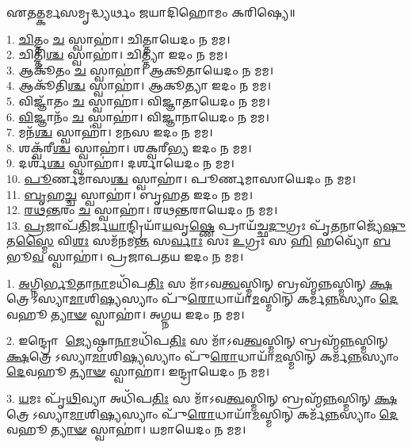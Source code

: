 
𑌏𑌤𑌤𑍍𑌕𑌰𑍍𑌮𑌸𑌮𑍃𑌦𑍍𑌧𑍍𑌯𑌰𑍍𑌥𑌂 𑌜𑌯𑌾𑌦𑌿𑌹𑍋𑌮𑌂 𑌕𑌰𑌿𑌷𑍍𑌯𑍇॥

1. \ul{𑌚𑌿}\-𑌤𑍍𑌤𑌂 \ul{𑌚} 𑌸𑍍𑌵𑌾𑌹𑌾॑। 𑌚𑌿𑌤𑍍𑌤𑌾𑌯𑍇𑌦𑌂 𑌨 𑌮𑌮।\\
2. 𑌚𑌿𑌤𑍍𑌤𑌿᳴\-\ul{𑌶𑍍𑌚} 𑌸𑍍𑌵𑌾𑌹𑌾॑। 𑌚𑌿𑌤𑍍𑌤𑍍𑌯𑌾 𑌇𑌦𑌂 𑌨 𑌮𑌮।\\
3. 𑌆𑌕𑍂᳴𑌤𑌂 \ul{𑌚} 𑌸𑍍𑌵𑌾𑌹𑌾॑। 𑌆𑌕𑍂𑌤𑌾𑌯𑍇𑌦𑌂 𑌨 𑌮𑌮।\\
4. 𑌆𑌕𑍂᳴𑌤𑌿\-\ul{𑌶𑍍𑌚} 𑌸𑍍𑌵𑌾𑌹𑌾॑। 𑌆𑌕𑍂𑌤𑍍𑌯𑌾 𑌇𑌦𑌂 𑌨 𑌮𑌮।\\
5. 𑌵𑌿𑌜𑍍𑌞𑌾᳴𑌤𑌂 \ul{𑌚} 𑌸𑍍𑌵𑌾𑌹𑌾॑। 𑌵𑌿𑌜𑍍𑌞𑌾𑌤𑌾𑌯𑍇𑌦𑌂 𑌨 𑌮𑌮।\\
6. \ul{𑌵𑌿}\-𑌜𑍍𑌞𑌾𑌨𑌂᳴ \ul{𑌚} 𑌸𑍍𑌵𑌾𑌹𑌾॑। 𑌵𑌿𑌜𑍍𑌞𑌾𑌨𑌾𑌯𑍇𑌦𑌂 𑌨 𑌮𑌮।\\
7. 𑌮𑌨᳴\-\ul{𑌶𑍍𑌚} 𑌸𑍍𑌵𑌾𑌹𑌾॑। 𑌮𑌨𑌸 𑌇𑌦𑌂 𑌨 𑌮𑌮।\\
8. 𑌶𑌕𑍍𑌵᳴𑌰𑍀\-\ul{𑌶𑍍𑌚} 𑌸𑍍𑌵𑌾𑌹𑌾॑। 𑌶𑌕𑍍𑌵𑌰𑍀𑌭𑍍𑌯 𑌇𑌦𑌂 𑌨 𑌮𑌮।\\
9. 𑌦𑌰𑍍𑌶᳴\-\ul{𑌶𑍍𑌚} 𑌸𑍍𑌵𑌾𑌹𑌾॑। 𑌦𑌰𑍍𑌶𑌾𑌯𑍇𑌦𑌂 𑌨 𑌮𑌮।\\
10. \ul{𑌪𑍂}\-𑌰𑍍𑌣𑌮𑌾᳴𑌸\-\ul{𑌶𑍍𑌚} 𑌸𑍍𑌵𑌾𑌹𑌾॑। 𑌪𑍂𑌰𑍍𑌣𑌮𑌾𑌸𑌾𑌯𑍇𑌦𑌂 𑌨 𑌮𑌮।\\
11. \ul{𑌬𑍃}\-𑌹\-\ul{𑌚𑍍𑌚} 𑌸𑍍𑌵𑌾𑌹𑌾॑। 𑌬𑍃𑌹𑌤 𑌇𑌦𑌂 𑌨 𑌮𑌮।\\
12. \ul{𑌰}\-\-\ul{𑌥}\-\-\ul{𑌨𑍍𑌤}\-𑌰𑌂 \ul{𑌚} 𑌸𑍍𑌵𑌾𑌹𑌾॑। 𑌰𑌥𑌨𑍍𑌤𑌰𑌾𑌯𑍇𑌦𑌂 𑌨 𑌮𑌮।\\
13. \ul{𑌪𑍍𑌰}\-𑌜𑌾𑌪᳴\-\ul{𑌤𑌿}\-𑌰𑍍𑌜\-\ul{𑌯𑌾}\-𑌨𑍍𑌦𑍍𑌰𑌿𑌯𑌾᳴\-\ul{𑌯}\-𑌵𑍃\-\ul{𑌷𑍍𑌣𑍇} 𑌪𑍍𑌰𑌾𑌯᳴𑌚𑍍𑌛\-\ul{𑌦𑍁}\-𑌗𑍍𑌰𑌃 𑌪𑍃᳴\-\ul{𑌤}\-𑌨𑌾𑌜𑍍𑌯𑍇᳴\-\ul{𑌷𑍁} 𑌤\-\ul{𑌸𑍍𑌮𑍈} 𑌵𑌿\-\ul{𑌶𑌃} 𑌸𑌮᳴𑌨𑌮\-\ul{𑌨𑍍𑌤} 𑌸\-\ul{𑌰𑍍𑌵𑌾𑌃} 𑌸𑌃 \ul{𑌉}\-𑌗𑍍𑌰𑌃 𑌸 \ul{𑌹𑌿} 𑌹𑌵𑍍𑌯𑍋᳴ \ul{𑌬}\-𑌭𑍂\-\ul{𑌵} 𑌸𑍍𑌵𑌾𑌹𑌾॑। 𑌪𑍍𑌰𑌜𑌾𑌪𑌤𑌯 𑌇𑌦𑌂 𑌨 𑌮𑌮।\\

\clearpage

1. \ul{𑌅}\-𑌗𑍍𑌨𑌿\-\ul{𑌰𑍍𑌭𑍂}\-𑌤𑌾\-\ul{𑌨𑌾}\-𑌮𑌧𑌿᳴𑌪\-\ul{𑌤𑌿𑌃} 𑌸 𑌮𑌾᳴𑌽𑌵\-\ul{𑌤𑍍𑌵}\-𑌸𑍍𑌮𑌿𑌨𑍍 𑌬𑍍𑌰𑌹𑍍𑌮᳴\-\ul{𑌨𑍍𑌨}\-𑌸𑍍𑌮𑌿𑌨𑍍 \ul{𑌕𑍍𑌷}\-𑌤𑍍𑌰𑍇𑌽𑌸𑍍𑌯𑌾\-\ul{𑌮𑌾}\-𑌶𑌿\-\ul{𑌷𑍍𑌯}\-𑌸𑍍𑌯𑌾𑌂 𑌪𑍁᳴\-\ul{𑌰𑍋}\-𑌧𑌾𑌯𑌾᳴\-\ul{𑌮}\-𑌸𑍍𑌮𑌿𑌨𑍍 𑌕𑌰𑍍𑌮᳴\-\ul{𑌨𑍍𑌨}\-𑌸𑍍𑌯𑌾𑌂 \ul{𑌦𑍇}\-𑌵𑌹𑍂\-\ul{𑌤𑍍𑌯𑌾}\-\-\ul{𑍟} 𑌸𑍍𑌵𑌾𑌹𑌾॑। 𑌅𑌗𑍍𑌨𑌯 𑌇𑌦𑌂 𑌨 𑌮𑌮।

2. 𑌇𑌨𑍍𑌦𑍍𑌰𑍋 \ul{𑌜𑍍𑌯𑍇}\-𑌷𑍍𑌠𑌾\-\ul{𑌨𑌾}\-𑌮𑌧𑌿᳴𑌪\-\ul{𑌤𑌿𑌃} 𑌸 𑌮𑌾᳴𑌽𑌵\-\ul{𑌤𑍍𑌵}\-𑌸𑍍𑌮𑌿𑌨𑍍 𑌬𑍍𑌰𑌹𑍍𑌮᳴\-\ul{𑌨𑍍𑌨}\-𑌸𑍍𑌮𑌿𑌨𑍍 \ul{𑌕𑍍𑌷}\-𑌤𑍍𑌰𑍇𑌽𑌸𑍍𑌯𑌾\-\ul{𑌮𑌾}\-𑌶𑌿\-\ul{𑌷𑍍𑌯}\-𑌸𑍍𑌯𑌾𑌂 𑌪𑍁᳴\-\ul{𑌰𑍋}\-𑌧𑌾𑌯𑌾᳴\-\ul{𑌮}\-𑌸𑍍𑌮𑌿𑌨𑍍 𑌕𑌰𑍍𑌮᳴\-\ul{𑌨𑍍𑌨}\-𑌸𑍍𑌯𑌾𑌂 \ul{𑌦𑍇}\-𑌵𑌹𑍂\-\ul{𑌤𑍍𑌯𑌾}\-\-\ul{𑍟} 𑌸𑍍𑌵𑌾𑌹𑌾॑। 𑌇𑌨𑍍𑌦𑍍𑌰𑌾𑌯𑍇𑌦𑌂 𑌨 𑌮𑌮।

3. \ul{𑌯}\-𑌮𑌃 𑌪𑍃᳴\-\ul{𑌥𑌿}\-𑌵𑍍𑌯𑌾 𑌅𑌧𑌿᳴𑌪\-\ul{𑌤𑌿𑌃} 𑌸 𑌮𑌾᳴𑌽𑌵\-\ul{𑌤𑍍𑌵}\-𑌸𑍍𑌮𑌿𑌨𑍍 𑌬𑍍𑌰𑌹𑍍𑌮᳴\-\ul{𑌨𑍍𑌨}\-𑌸𑍍𑌮𑌿𑌨𑍍 \ul{𑌕𑍍𑌷}\-𑌤𑍍𑌰𑍇𑌽𑌸𑍍𑌯𑌾\-\ul{𑌮𑌾}\-𑌶𑌿\-\ul{𑌷𑍍𑌯}\-𑌸𑍍𑌯𑌾𑌂 𑌪𑍁᳴\-\ul{𑌰𑍋}\-𑌧𑌾𑌯𑌾᳴\-\ul{𑌮}\-𑌸𑍍𑌮𑌿𑌨𑍍 𑌕𑌰𑍍𑌮᳴\-\ul{𑌨𑍍𑌨}\-𑌸𑍍𑌯𑌾𑌂 \ul{𑌦𑍇}\-𑌵𑌹𑍂\-\ul{𑌤𑍍𑌯𑌾}\-\-\ul{𑍟} 𑌸𑍍𑌵𑌾𑌹𑌾॑। 𑌯𑌮𑌾𑌯𑍇𑌦𑌂 𑌨 𑌮𑌮।

